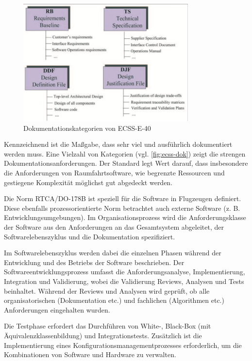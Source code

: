 \begin{figure}
  \centering
  \includegraphics[width=0.8\textwidth]{img/ecss-dokumentation.png}
  \caption{Dokumentationskategorien von ECSS-E-40 \parencite[][]{jones2002introducing}}
  \label{fig:ecss-dok}
\end{figure}
Kennzeichnend ist die Maßgabe, dass sehr viel und ausführlich dokumentiert werden muss.
Eine Vielzahl von Kategorien (vgl. \autoref{fig:ecss-dok}) zeigt die strengen Dokumentationsanforderungen.
Der Standard legt Wert darauf, dass insbesondere die Anforderungen von Raumfahrtsoftware, wie begrenzte Ressourcen und gestiegene Komplexität möglichst gut abgedeckt werden.
\parencite[Vgl.][]{jones2002introducing}

Die Norm RTCA/DO-178B ist speziell für die Software in Flugzeugen definiert.
Diese ebenfalls prozessorientierte Norm betrachtet auch externe Software (z. B. Entwicklungsumgebungen).
Im Organisationsprozess wird die Anforderungsklasse der Software aus den Anforderungen an das Gesamtsystem abgeleitet, der Softwarelebenszyklus und die Dokumentation spezifiziert.

Im Softwarelebenszyklus werden dabei die einzelnen Phasen während der Entwicklung und des Betriebs der Software beschrieben.
Der Softwareentwicklungsprozess umfasst die Anforderungsanalyse, Implementierung, Integration und Validierung, wobei die Validierung Reviews, Analysen und Tests beinhaltet.
Während der Reviews und Analysen wird geprüft, ob alle organisatorischen (Dokumentation etc.) und fachlichen (Algorithmen etc.) Anforderungen eingehalten wurden.

Die Testphase erfordert das Durchführen von White-, Black-Box (mit Äquivalenzklassenbildung) und Integrationstests.
Zusätzlich ist die Implementierung eines Konfigurationsmanagementprozesses erforderlich, um die Kombinationen von Software und Hardware zu verwalten.
\parencite[Vgl.][S. 71ff]{Hohler:1998aa}

